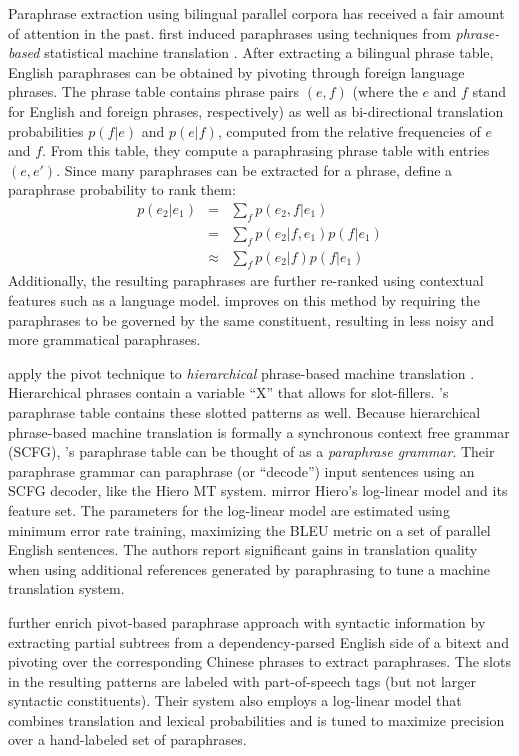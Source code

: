 \documentclass[11pt]{article}
\begin{document}
Paraphrase extraction using bilingual parallel corpora has received a
fair amount of attention in the past. 
first induced paraphrases using techniques from {\it phrase-based}
statistical machine translation \cite{Koehn2003}. After extracting a
bilingual phrase table, English paraphrases can be obtained by
pivoting through foreign language phrases. The phrase table contains
phrase pairs $(e, f)$ (where the $e$ and $f$ stand for English and
foreign phrases, respectively) as well as bi-directional translation
probabilities $p(f | e)$ and $p(e | f)$, computed from the relative
frequencies of $e$ and $f$. From this table, they compute a
paraphrasing phrase table with entries $(e, e')$. Since many
paraphrases can be extracted for a phrase,
 define a paraphrase probability to rank
them:
\begin{eqnarray}
  p(e_2|e_1) &=& \sum_f p(e_2,f|e_1)\\
                  &=& \sum_f p(e_2|f,e_1) p(f|e_1) \\
                  &\approx& \sum_f p(e_2|f) p(f|e_1)
\label{paraphrase_prob_eqn}
\end{eqnarray}
Additionally, the resulting paraphrases are further re-ranked using
contextual features such as a language model.
 improves on this method by requiring the
paraphrases to be governed by the same constituent, resulting in less
noisy and more grammatical paraphrases.

 apply the pivot technique to {\it hierarchical}
phrase-based machine translation \cite{Chiang2005}. Hierarchical
phrases contain a variable ``X'' that allows for slot-fillers.
's paraphrase table contains these slotted
patterns as well. Because hierarchical phrase-based machine
translation is formally a synchronous context free grammar (SCFG),
's paraphrase table can be thought of as a {\it
  paraphrase grammar}. Their paraphrase grammar can paraphrase (or
``decode'') input sentences using an SCFG decoder, like the Hiero MT
system.  mirror Hiero's log-linear model and its
feature set. The parameters for the log-linear model are estimated
using minimum error rate training, maximizing the BLEU metric on a set
of parallel English sentences. The authors report significant gains in
translation quality when using additional references generated by
paraphrasing to tune a machine translation system.

 further enrich pivot-based paraphrase approach with
syntactic information by extracting partial subtrees from a
dependency-parsed English side of a bitext and pivoting over the
corresponding Chinese phrases to extract paraphrases. The slots in the
resulting patterns are labeled with part-of-speech tags (but not
larger syntactic constituents). Their system also employs a log-linear
model that combines translation and lexical probabilities and is tuned
to maximize precision over a hand-labeled set of paraphrases.
\end{document}
